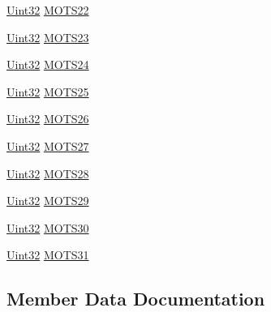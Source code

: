 \begin{DoxyCompactItemize}
\item 
\hyperlink{_d_s_p2833x___device_8h_aba99025e657f892beb7ff31cecf64653}{Uint32} \hyperlink{struct_m_o_t_s___r_e_g_s_a94403e34d9ddfd9939093622fdda79c9}{M\+O\+T\+S22}
\item 
\hyperlink{_d_s_p2833x___device_8h_aba99025e657f892beb7ff31cecf64653}{Uint32} \hyperlink{struct_m_o_t_s___r_e_g_s_ab186c15fa13a51b5539a8c1c4c20392f}{M\+O\+T\+S23}
\item 
\hyperlink{_d_s_p2833x___device_8h_aba99025e657f892beb7ff31cecf64653}{Uint32} \hyperlink{struct_m_o_t_s___r_e_g_s_a5e051f837424bd389b3475e4d2e0fb36}{M\+O\+T\+S24}
\item 
\hyperlink{_d_s_p2833x___device_8h_aba99025e657f892beb7ff31cecf64653}{Uint32} \hyperlink{struct_m_o_t_s___r_e_g_s_aa1264a03eed535504663db51e4d32bb8}{M\+O\+T\+S25}
\item 
\hyperlink{_d_s_p2833x___device_8h_aba99025e657f892beb7ff31cecf64653}{Uint32} \hyperlink{struct_m_o_t_s___r_e_g_s_af867573393e23c997fb52c71deaa9a26}{M\+O\+T\+S26}
\item 
\hyperlink{_d_s_p2833x___device_8h_aba99025e657f892beb7ff31cecf64653}{Uint32} \hyperlink{struct_m_o_t_s___r_e_g_s_ac533dd7180fe545abd5e945c442e7a31}{M\+O\+T\+S27}
\item 
\hyperlink{_d_s_p2833x___device_8h_aba99025e657f892beb7ff31cecf64653}{Uint32} \hyperlink{struct_m_o_t_s___r_e_g_s_aef23e1e4fe12f43095b3f25b3c3b1d8d}{M\+O\+T\+S28}
\item 
\hyperlink{_d_s_p2833x___device_8h_aba99025e657f892beb7ff31cecf64653}{Uint32} \hyperlink{struct_m_o_t_s___r_e_g_s_a240e82a96c875af14edfbdc0657202df}{M\+O\+T\+S29}
\item 
\hyperlink{_d_s_p2833x___device_8h_aba99025e657f892beb7ff31cecf64653}{Uint32} \hyperlink{struct_m_o_t_s___r_e_g_s_a5618686c52cefda5a379a83a9cacb83b}{M\+O\+T\+S30}
\item 
\hyperlink{_d_s_p2833x___device_8h_aba99025e657f892beb7ff31cecf64653}{Uint32} \hyperlink{struct_m_o_t_s___r_e_g_s_aa28160fc17eb584ea506fae8462fc769}{M\+O\+T\+S31}
\end{DoxyCompactItemize}


\subsection{Member Data Documentation}
\hypertarget{struct_m_o_t_s___r_e_g_s_a60a93027539b550013131b3c9278ef23}{}

